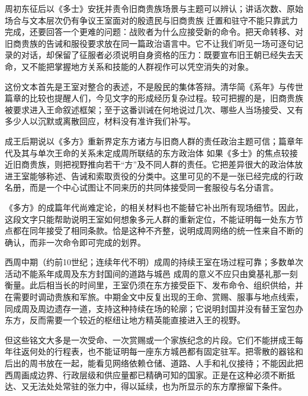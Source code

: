 \begin{event}{周初东征后}{以《多士》安抚并责令旧商贵族}{场景与主题可以辨认；讲话次数、原始场合与文本层次仍有争议}{王室面对的殷遗民与旧商贵族}
迁置和驻守不能只靠武力完成，还要回答一个更难的问题：战败者为什么应接受新的命令。把天命转移、对旧商贵族的告诫和服役要求放在同一篇政治语言中。它不让我们听见一场可逐句记录的对话，却保留了征服者必须说明自身资格的压力：既要宣布旧王朝已经失去天命，又不能把掌握地方关系和技能的人群视作可以凭空消失的对象。

这份文本首先是王室对整合的表述，不是殷民的集体答辩。清华简《系年》与传世篇章的比较也提醒人们，今见文字的形成经历复杂过程。较可把握的是，旧商贵族被要求进入王命叙述框架；至于这番训诫在何地说过几次、哪些人当场接受、又有多少人以沉默或离散回应，材料没有准许我们补写。
\end{event}

\begin{event}{成王后期说}{以《多方》重新界定东方诸方与旧商人群的责任}{政治主题可信；篇章年代及其与单次王命的关系未定}{成周所联结的东方政治体}
如果《多士》的焦点较接近旧商贵族，则把视野推向若干“方”及不同人群的责任。它把差异很大的政治体放进王室能够称述、告诫和索取贡役的分类中。这里可见的不是一张已经完成的行政名册，而是一个中心试图让不同来历的共同体接受同一套服役与名分语言。

《多方》的成篇年代尚难定论，的相关材料也不能替它补出所有现场细节。因此，这段文字只能帮助说明王室如何想象多元人群的重新定位，不能证明每一处东方节点都在同年接受了相同条款。恰是这种不齐整，说明成周网络的统一性来自不断的确认，而非一次命令即可完成的划界。
\end{event}

\begin{event}{西周中期（约前10世纪；连续年代不明）}{成周的持续王室在场}{过程可靠；多数单次活动不能系年}{成周及东方封国间的道路与城邑}
成周的意义不应只由奠基礼那一刻衡量。此后相当长的时间里，王室仍须在东方接受臣下、发布命令、组织供给，并在需要时调动贵族和军旅。中期金文中反复出现的王命、赏赐、服事与地点线索，同成周及周边遗存一道，支持这种持续在场的轮廓；它说明封国并没有替王室包办东方，反而需要一个较近的枢纽让地方精英能直接进入王的视野。

但这些铭文大多是一次受命、一次赏赐或一个家族纪念的片段。它们不能拼成王每年往返何处的行程表，也不能证明每一座东方城邑都有固定驻军。把零散的器铭和后出的周书放在一起，能看见网络依赖仓储、道路、人手和礼仪接待；不能因此把西周画成边界、行政层级和供应量都已精确可知的国家。正是在这种必须不断抵达、又无法处处常驻的张力中，得以延续，也为所显示的东方摩擦留下条件。
\end{event}

